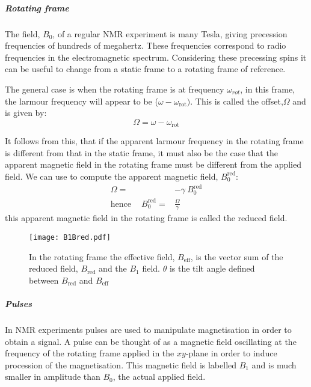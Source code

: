 \subparagraph{Rotating frame}

The field, $B_0$, of a regular NMR experiment is many Tesla, giving precession
frequencies of hundreds of megahertz. These frequencies correspond to radio frequencies in the electromagnetic spectrum. Considering these precessing spins
it can be useful to change from a static frame to a rotating frame of reference.

The general case is when the rotating frame is at frequency $\omega_{rot}$, in this
frame, the larmour frequency will appear to be ($\omega - \omega_{\text{rot}})$. This is called the offset,$\Omega$ and is given by:
\begin{equation}
  \Omega = \omega -\omega_{\text{rot}}
\end{equation}

It follows from this, that if the apparent larmour frequency in the rotating frame is different from that in the static frame, it must also be the case that the apparent magnetic field in the rotating frame must be different from the applied
field. We can use  to compute the apparent magnetic field, $B^{\text{red}}_0$:
\begin{align}\label{eqn:redB}
  \Omega =& -\gamma~B^{\text{red}}_0\\
\text{hence}\quad~B^{\text{red}}_0 =& \frac{\Omega}{\gamma}
\end{align}
this apparent magnetic field in the rotating frame is called the reduced field.

\begin{figure}
  \begin{center}
  \texttt{[image: B1Bred.pdf]}
  \end{center}
  \caption{In the rotating frame the effective field, $B_{\text{eff}}$, is the vector sum of the reduced field,
  $B_{\text{red}}$ and the $B_1$ field. $\theta$ is the tilt angle defined between $B_{\text{red}}$ and $B_{\text{eff}}$}
  \label{fig:BMag}
\end{figure}


\subparagraph{Pulses}

In NMR experiments pulses are used to manipulate magnetisation in order to obtain a signal. A pulse can be
thought of as a magnetic field oscillating at the frequency of the rotating frame
applied in the $xy$-plane in order to induce procession of the magnetisation. This magnetic field is labelled $B_1$ and is much smaller in amplitude than $B_0$, the actual applied field.


